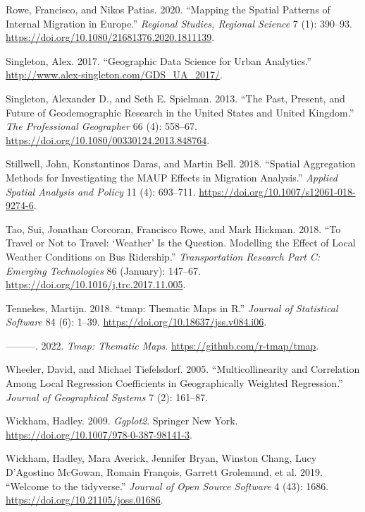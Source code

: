 \documentclass[
  letterpaper,
  DIV=11,
  numbers=noendperiod,
  oneside]{scrreprt}
\newlength{\cslhangindent}
\newenvironment{CSLReferences}[2] %
 {\begin{list}{}{%
  \setlength{\itemindent}{0pt}
  \setlength{\leftmargin}{0pt}
  \setlength{\parsep}{0pt}
  \ifodd #1
   \setlength{\leftmargin}{\cslhangindent}
   \setlength{\itemindent}{-1\cslhangindent}
  \fi
  \setlength{\itemsep}{#2\baselineskip}}}
 {\end{list}}
\begin{document}
\begin{CSLReferences}{1}{0}
Rowe, Francisco, and Nikos Patias. 2020. {``Mapping the Spatial Patterns
of Internal Migration in Europe.''} \emph{Regional Studies, Regional
Science} 7 (1): 390--93.
\url{https://doi.org/10.1080/21681376.2020.1811139}.

Singleton, Alex. 2017. {``Geographic Data Science for Urban
Analytics.''} \url{http://www.alex-singleton.com/GDS_UA_2017/}.

Singleton, Alexander D., and Seth E. Spielman. 2013. {``The Past,
Present, and Future of Geodemographic Research in the United States and
United Kingdom.''} \emph{The Professional Geographer} 66 (4): 558--67.
\url{https://doi.org/10.1080/00330124.2013.848764}.

Stillwell, John, Konstantinos Daras, and Martin Bell. 2018. {``Spatial
Aggregation Methods for Investigating the MAUP Effects in Migration
Analysis.''} \emph{Applied Spatial Analysis and Policy} 11 (4):
693--711. \url{https://doi.org/10.1007/s12061-018-9274-6}.

Tao, Sui, Jonathan Corcoran, Francisco Rowe, and Mark Hickman. 2018.
{``To Travel or Not to Travel: {`}Weather{'} Is the Question. Modelling
the Effect of Local Weather Conditions on Bus Ridership.''}
\emph{Transportation Research Part C: Emerging Technologies} 86
(January): 147--67. \url{https://doi.org/10.1016/j.trc.2017.11.005}.

Tennekes, Martijn. 2018. {``{tmap}: Thematic Maps in {R}.''}
\emph{Journal of Statistical Software} 84 (6): 1--39.
\url{https://doi.org/10.18637/jss.v084.i06}.

---------. 2022. \emph{Tmap: Thematic Maps}.
\url{https://github.com/r-tmap/tmap}.

Wheeler, David, and Michael Tiefelsdorf. 2005. {``Multicollinearity and
Correlation Among Local Regression Coefficients in Geographically
Weighted Regression.''} \emph{Journal of Geographical Systems} 7 (2):
161--87.

Wickham, Hadley. 2009. \emph{Ggplot2}. Springer New York.
\url{https://doi.org/10.1007/978-0-387-98141-3}.

Wickham, Hadley, Mara Averick, Jennifer Bryan, Winston Chang, Lucy
D'Agostino McGowan, Romain François, Garrett Grolemund, et al. 2019.
{``Welcome to the {tidyverse}.''} \emph{Journal of Open Source Software}
4 (43): 1686. \url{https://doi.org/10.21105/joss.01686}.


\end{CSLReferences}
\end{document}
